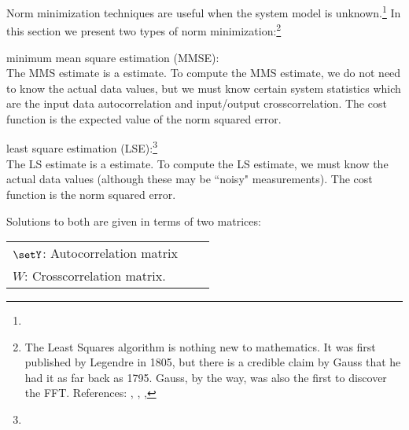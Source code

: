 Norm minimization techniques are useful when the system model is unknown.\footnote{}
In this section we present two types of norm minimization:\footnote{
   The Least Squares algorithm is nothing new to mathematics.
   It was first published by Legendre in 1805, but there is a credible claim by Gauss
   that he had it as far back as 1795.
   Gauss, by the way, was also the first to discover the FFT.
   References:
   ,
   ,
   ,
   }

\begin{enume}
  \item minimum mean square estimation (MMSE): \\
        The MMS estimate is a  estimate.
        To compute the MMS estimate, we do not need to know
        the actual data values, but we must know certain system statistics
        which are the
        input data autocorrelation and input/output crosscorrelation.
        The cost function is the expected value of the norm squared error.
   \item least square estimation (LSE):\footnote{} \\
        The LS estimate is a  estimate.
        To compute the LS estimate, we must know the actual data values
        (although these may be ``noisy" measurements).
        The cost function is the norm squared error.
\end{enume}

Solutions to both are given in terms of two matrices:

\begin{tabular}{lll}
   $\setY$: Autocorrelation matrix \\
   $W$: Crosscorrelation matrix.
\end{tabular}

